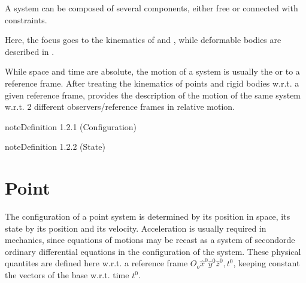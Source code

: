 \documentclass[letterpaper,10pt,english]{jupyterBook}
\begin{document}
\sphinxAtStartPar
A system can be composed of several components, either free or connected with constraints.

\sphinxAtStartPar
Here, the focus goes to the kinematics of {\hyperref[\detokenize{ch/kinematics-point:classical-mechanics-kinematics-point}]{}} and {\hyperref[\detokenize{ch/kinematics-rigid:classical-mechanics-kinematics-rigid-body}]{}}, while deformable bodies are described in  \sphinxhyphen{} .

\sphinxAtStartPar
While space and time are absolute, the motion of a system is usually the  or to a reference frame. After treating the kinematics of points and rigid bodies w.r.t. a given reference frame, {\hyperref[\detokenize{ch/kinematics-relative:classical-mechanics-kinematics-relative}]{}} provides the description of the motion of the same system w.r.t. 2 different observers/reference frames in relative motion.
\label{ch/kinematics:definition-0}
\begin{sphinxadmonition}{note}{Definition 1.2.1 (Configuration)}


\end{sphinxadmonition}
\label{ch/kinematics:definition-1}
\begin{sphinxadmonition}{note}{Definition 1.2.2 (State)}


\end{sphinxadmonition}

\sphinxstepscope


\section{Point}
\label{\detokenize{ch/kinematics-point:point}}\label{\detokenize{ch/kinematics-point:classical-mechanics-kinematics-point}}\label{\detokenize{ch/kinematics-point::doc}}
\sphinxAtStartPar
The configuration of a point system is determined by its position in space, its state by its position and its velocity. Acceleration is usually required in mechanics, since equations of motions may be recast as a system of second\sphinxhyphen{}orde ordinary differential equations in the configuration of the system. These physical quantites are defined here w.r.t. a reference frame \(O_o \hat{x}^0 \hat{y}^0 \hat{z}^0, t^0\), keeping constant the vectors of the base w.r.t. time \(t^0\).
\end{document}
